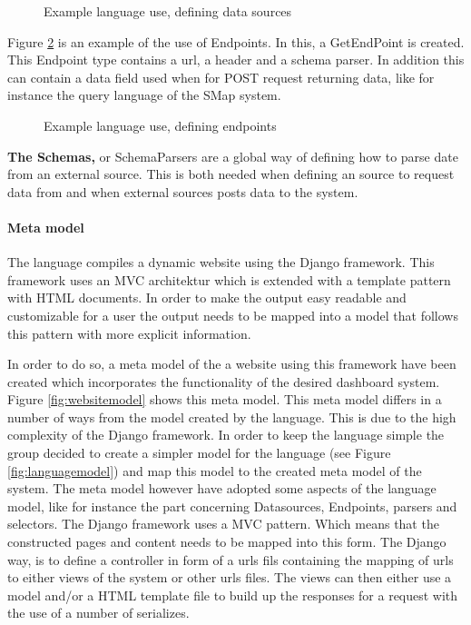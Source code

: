 \begin{figure}
\begin{center}

\end{center}
\caption{Example language use, defining data sources}
\label{fig:exampleDatasources}
\end{figure}

Figure \ref{fig:exampleEndpoints} is an example of the use of Endpoints.
In this, a GetEndPoint is created. This Endpoint type contains a url, a header and a schema parser.
In addition this can contain a data field used when for POST request returning data, like for instance the query language of the SMap system.
\begin{figure}
\begin{center}

\end{center}
\caption{Example language use, defining endpoints}
\label{fig:exampleEndpoints}
\end{figure}

\textbf{The Schemas,} or SchemaParsers are a global way of defining how to parse date from an external source.
This is both needed when defining an source to request data from and when external sources posts data to the system.

\paragraph{Meta model}
The language compiles a dynamic website using the Django framework.
This framework uses an MVC architektur which is extended with a template pattern with HTML documents. 
In order to make the output easy readable and customizable for a user the output needs to be mapped into a model that follows this pattern with more explicit information.

In order to do so, a meta model of the a website using this framework have been created which incorporates the functionality of the desired dashboard system.  
Figure \ref{fig:websitemodel} shows this meta model.
This meta model differs in a number of ways from the model created by the language.
This is due to the high complexity of the Django framework.
In order to keep the language simple the group decided to create a simpler model for the language (see Figure \ref{fig:languagemodel}) and map this model to the created meta model of the system.
The meta model however have adopted some aspects of the language model, like for instance the part concerning Datasources, Endpoints, parsers and selectors.
The Django framework uses a MVC pattern. 
Which means that the constructed pages and content needs to be mapped into this form.
The Django way, is to define a controller in form of a urls fils containing the mapping of urls to either views of the system or other urls files.
The views can then either use a model and/or a HTML template file to build up the responses for a request with the use of a number of serializes.

